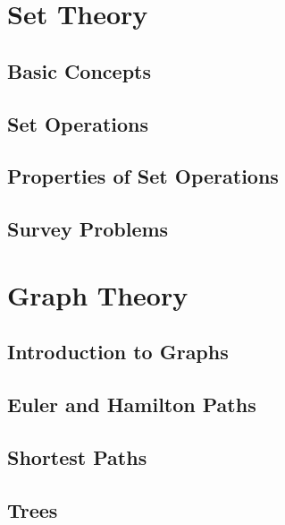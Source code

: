 \documentclass[9pt,letter,twoside,openright,fleqn]{memoir}
\begin{document}
\chapter{Set Theory}
\vfill
\pagebreak

\section{Basic Concepts}

\vfill
\pagebreak

\section{Set Operations}

\pagebreak

\section{Properties of Set Operations}

\vfill
\pagebreak

\section{Survey Problems}

\vfill
\pagebreak

\chapter{Graph Theory}
\vfill
\pagebreak

\section{Introduction to Graphs}


\section{Euler and Hamilton Paths}


\section{Shortest Paths}


\section{Trees}

\end{document}
